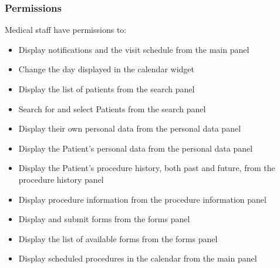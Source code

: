 \subsubsection{Permissions}
Medical staff have permissions to:\begin{itemize}
    \item Display notifications and the visit schedule from the main panel
    \item Change the day displayed in the calendar widget
    \item Display the list of patients from the search panel
    \item Search for and select Patients from the search panel
    \item Display their own personal data from the personal data panel
    \item Display the Patient's personal data from the personal data panel
    \item Display the Patient's procedure history, both past and future, from the procedure history panel
    \item Display procedure information from the procedure information panel
    \item Display and submit forms from the forms panel
    \item Display the list of available forms from the forms panel
    \item Display scheduled procedures in the calendar from the main panel
\end{itemize}
